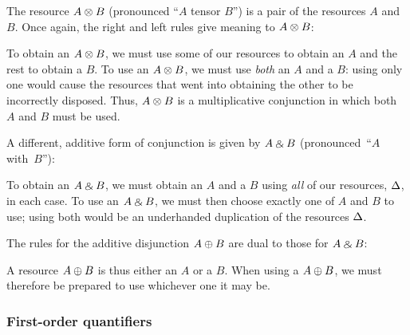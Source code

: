 The resource $A \otimes B$ (pronounced \enquote{$A$ tensor $B$}) is a pair of the resources $A$ and $B$.
Once again, the right and left rules give meaning to $A \otimes B$:
To obtain an $A \otimes B$, we must use some of our resources to obtain an $A$ and the rest to obtain a $B$.
To use an $A \otimes B$, we must use \emph{both} an $A$ and a $B$: using only one would cause the resources that went into obtaining the other to be incorrectly disposed.
Thus, $A \otimes B$ is a multiplicative conjunction in which both $A$ and $B$ must be used.

A different, additive form of conjunction is given by $A \mathbin{\binampersand} B$ (pronounced~\enquote{$A$ with~$B$}):
To obtain an $A \mathbin{\binampersand} B$, we must obtain an $A$ and a $B$ using \emph{all} of our resources, $\Delta$, in each case.
To use an $A \mathbin{\binampersand} B$, we must then choose exactly one of $A$ and $B$ to use; using both would be an underhanded duplication of the resources $\Delta$.

The rules for the additive disjunction $A \oplus B$ are dual to those for $A \mathbin{\binampersand} B$:
A resource $A \oplus B$ is thus either an $A$ or a $B$.
When using a $A \oplus B$, we must therefore be prepared to use whichever one it may be.

\subsubsection{First-order quantifiers}\label{sec:first-order-quant}


